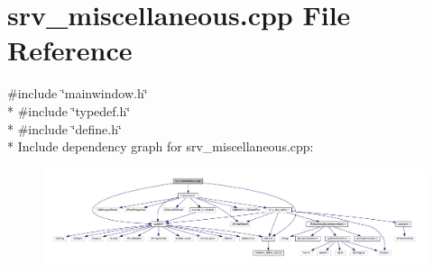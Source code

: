 \hypertarget{a00135}{\section{srv\+\_\+miscellaneous.\+cpp File Reference}
\label{a00135}
}
{\ttfamily \#include \char`\"{}mainwindow.\+h\char`\"{}}\\*
{\ttfamily \#include \char`\"{}typedef.\+h\char`\"{}}\\*
{\ttfamily \#include \char`\"{}define.\+h\char`\"{}}\\*
Include dependency graph for srv\+\_\+miscellaneous.\+cpp\+:
\nopagebreak
\begin{figure}[H]
\begin{center}
\leavevmode
\includegraphics[width=350pt]{db/ddc/a00353}
\end{center}
\end{figure}

